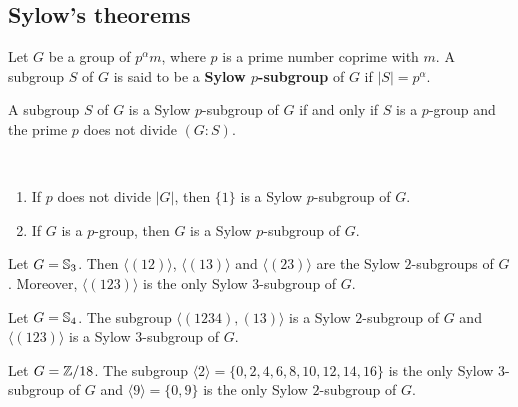 \subsection{Sylow's theorems}

\begin{definition}
Let $G$ be a group of $p^\alpha m$, where $p$ is a prime number
coprime with $m$. A subgroup $S$ of $G$ is said to be a \textbf{Sylow $p$-subgroup} of $G$ if $|S|=p^\alpha$.
\end{definition}

A subgroup $S$ of $G$ is a Sylow 
$p$-subgroup of $G$ if and only if $S$ is a $p$-group and
the prime $p$ does not divide $(G:S)$.

\begin{example}\
\begin{enumerate}
\item If $p$ does not divide $|G|$, then $\{1\}$ is a 
Sylow $p$-subgroup of $G$.
\item If $G$ is a $p$-group, then $G$ is a Sylow
$p$-subgroup of $G$.
\end{enumerate}
\end{example}

\begin{example}
Let $G=\mathbb{S}_3$. Then $\langle (12)\rangle$, $\langle (13)\rangle$ and $\langle (23)\rangle$ are the Sylow $2$-subgroups of $G$. Moreover, 
$\langle (123)\rangle$ is the only Sylow $3$-subgroup of $G$.
\end{example}

\begin{example}
Let $G=\mathbb{S}_4$. The subgroup $\langle (1234),(13)\rangle$ is a Sylow $2$-subgroup of $G$ and 
$\langle (123)\rangle$ is a Sylow $3$-subgroup of $G$.
\end{example}

\begin{example}
Let $G=\mathbb{Z}/18$. The subgroup 
$\langle 2\rangle =\{0,2,4,6,8,10,12,14,16\}$ is the only Sylow $3$-subgroup of $G$ and $\langle 9\rangle=\{0,9\}$ is the only
Sylow $2$-subgroup of $G$.
\end{example}

